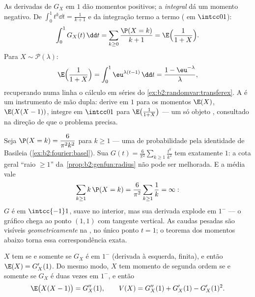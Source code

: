 \begin{example}\label{ex:b2:genfun:integraltrick}
As derivadas de $G_X$ em $1$ dão momentos positivos; a
\emph{integral} dá um momento negativo. De $\int_0^1t^k\dd t
= \frac1{k+1}$ e da integração termo a termo ( em $\intcc01$):
\[
\int_0^1G_X(t)\,\dd t = \sum_{k\geq0}\frac{\P(X =
k)}{k+1} = \E\Bigl(\frac1{1+X}\Bigr).
\]
Para $X \sim \mathcal P(\lambda)$:
\[
\E\Bigl(\frac1{1+X}\Bigr) =
\int_0^1\eu^{\lambda(t-1)}\,\dd t = \frac{1 -
\eu^{-\lambda}}{\lambda},
\]
recuperando numa linha o cálculo em séries do
\cref{ex:b2:randomvar:transferex}. A 
é um instrumento de mão dupla: derive em $1$ para os
momentos $\E(X)$, $\E(X(X-1))$, integre em $\intcc01$
para $\E\bigl(\frac1{1+X}\bigr)$ --- um só objeto ,
consultado na direção de que o problema precisa.
\end{example}

\begin{example}\label{ex:b2:genfun:heavytail}
Seja $\P(X = k) = \dfrac{6}{\pi^2k^2}$ para $k \geq 1$ --- uma
 de probabilidade pela identidade de Basileia
(\cref{ex:b2:fourier:basel}). Sua 
$G(t) = \frac6{\pi^2}\sum_{k\geq1}\frac{t^k}{k^2}$ tem  exatamente $1$: a cota geral ``raio $\geq
1$'' da~\cref{prop:b2:genfun:radius} não pode ser melhorada. E
a média vale
\[
\sum_{k\geq1}k\,\P(X = k) =
\frac6{\pi^2}\sum_{k\geq1}\frac1k = \infty :
\]
$G$ é  em $\intcc{-1}1$, suave no interior, mas sua
derivada explode em $1^-$ --- o gráfico chega ao
ponto $(1, 1)$ com tangente vertical. As caudas pesadas são
visíveis \emph{geometricamente} na , no
único ponto $t = 1$; o teorema dos momentos abaixo torna
essa correspondência exata.
\end{example}

\begin{theorem}\label{thm:b2:genfun:moments}
$X$ tem  se e somente se $G_X$ é  em
$1^-$ (derivada à esquerda, finita), e então $\E(X) = G_X'(1)$.
Do mesmo modo, $X$ tem momento de segunda ordem se e somente se $G_X$ é duas vezes
 em $1^-$, e então
\[
\E\bigl(X(X - 1)\bigr) = G_X''(1),
\qquad
V(X) = G_X''(1) + G_X'(1) - G_X'(1)^2 .
\]
\end{theorem}

